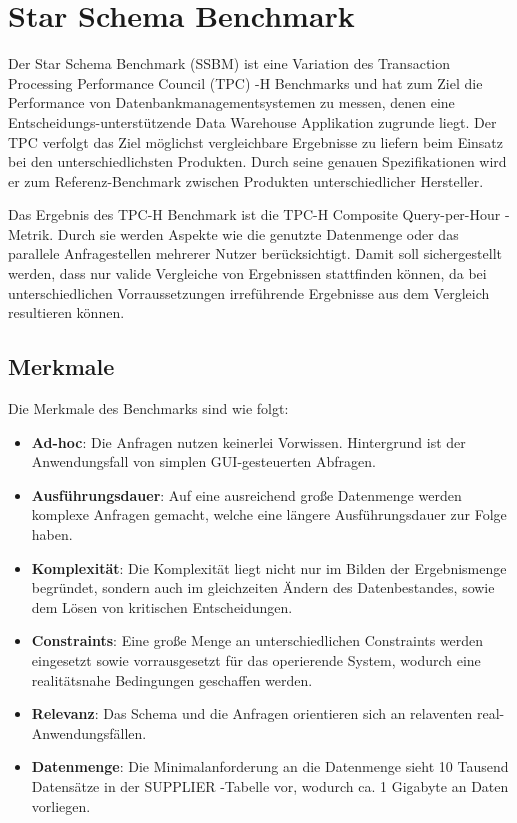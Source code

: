 \chapter{Star Schema Benchmark}

Der Star Schema Benchmark (SSBM) ist eine Variation des Transaction Processing Performance Council (TPC) -H Benchmarks und hat zum Ziel die Performance von Datenbankmanagementsystemen zu messen, denen eine Entscheidungs-unterstützende Data Warehouse Applikation zugrunde liegt. Der TPC verfolgt das Ziel möglichst vergleichbare Ergebnisse zu liefern beim Einsatz bei den unterschiedlichsten Produkten. Durch seine genauen  Spezifikationen wird er zum Referenz-Benchmark zwischen Produkten unterschiedlicher Hersteller. 

Das Ergebnis des TPC-H Benchmark ist die {\glqq}TPC-H Composite Query-per-Hour{\grqq} -Metrik. Durch sie werden Aspekte wie die genutzte Datenmenge oder das parallele Anfragestellen mehrerer Nutzer berücksichtigt. Damit soll sichergestellt werden, dass nur valide Vergleiche von Ergebnissen stattfinden können, da bei unterschiedlichen Vorraussetzungen irreführende Ergebnisse aus dem Vergleich resultieren können. 

\section{Merkmale}

Die Merkmale des Benchmarks sind wie folgt: 
\begin{itemize}
	\item \textbf{Ad-hoc}: Die Anfragen nutzen keinerlei Vorwissen. Hintergrund ist der Anwendungsfall von simplen GUI-gesteuerten Abfragen. 
	\item \textbf{Ausführungsdauer}: Auf eine ausreichend große Datenmenge werden komplexe Anfragen gemacht, welche eine längere Ausführungsdauer zur Folge haben. 
	\item \textbf{Komplexität}: Die Komplexität liegt nicht nur im Bilden der Ergebnismenge begründet, sondern auch im gleichzeiten Ändern des Datenbestandes, sowie dem Lösen von kritischen Entscheidungen. 
	\item \textbf{Constraints}: Eine große Menge an unterschiedlichen Constraints werden eingesetzt sowie vorrausgesetzt für das operierende System, wodurch eine realitätsnahe Bedingungen geschaffen werden. 
	\item \textbf{Relevanz}: Das Schema und die Anfragen orientieren sich an relaventen real-Anwendungsfällen. 
	\item \textbf{Datenmenge}: Die Minimalanforderung an die Datenmenge sieht 10 Tausend Datensätze in der {\glqq}SUPPLIER{\grqq} -Tabelle vor, wodurch ca. 1 Gigabyte an Daten vorliegen. 
\end{itemize}

